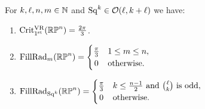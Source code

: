 
%

\medskip\proposition
For \(k,\ell,n,m \in \mathbb{N}\) and \(\operatorname{Sq}^k \in \mathcal{O}(\ell, k+\ell)\) we have:
\begin{enumerate}
	\item \(\operatorname{Crit^{\mathrm{VR}}_{1^{\mathrm{st}}}}(\mathbb{RP}^n) = \frac{2\pi}{3}\).
	\item \(\firstdeath{m}{\rp^n} =
	\begin{cases}
		\frac{\pi}{3} & 1 \leq m \leq n, \\
		\hfil 0 & \text{otherwise}.
	\end{cases}\)
	\item \(\firstdeath{\Sq^k}{\rp^n} =
	\begin{cases}
		\tfrac{\pi}{3} & k \leq \frac{n-1}{2} \text{ and } \binom{\ell}{k} \text{ is odd},\\
		\hfil 0 & \text{otherwise}. \\
	\end{cases}\)
\end{enumerate}


